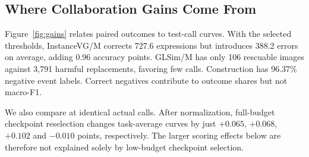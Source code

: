 \subsection{Where Collaboration Gains Come From}
\label{sec:gains}
Figure~\ref{fig:gains} relates paired outcomes to test-call curves. With the selected thresholds, InstanceVG/M corrects 727.6 expressions but introduces 388.2 errors on average, adding 0.96 accuracy points. GLSim/M has only 106 rescuable images against 3,791 harmful replacements, favoring few calls. Construction has 96.37\% negative event labels. Correct negatives contribute to outcome shares but not macro-F1.

We also compare at identical actual calls. After normalization, full-budget checkpoint reselection changes task-average curves by just $+0.065$, $+0.068$, $+0.102$ and $-0.010$ points, respectively. The larger scoring effects below are therefore not explained solely by low-budget checkpoint selection.
